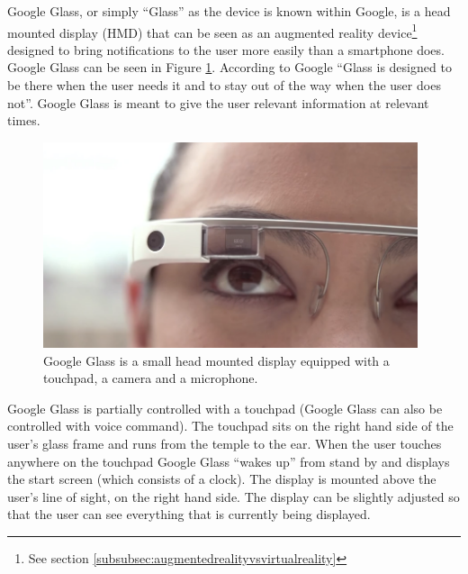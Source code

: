 Google Glass, or simply ``Glass'' as the device is known within Google, is a head mounted display (HMD) that can be seen as an augmented reality device\footnote{See section \ref{subsubsec:augmentedrealityvsvirtualreality}} designed to bring notifications to the user more easily than a smartphone does. Google Glass can be seen in Figure \ref{GoogleGlassHardware}. According to Google ``Glass is designed to be there when the user needs it and to stay out of the way when the user does not''.\cite{glassDesignPrinciples} Google Glass is meant to give the user relevant information at relevant times.\\ 

	\begin{figure}[ht!]
		\centering
		\includegraphics[width=110mm]{images/GoogleGlassHardware}
		\caption{Google Glass is a small head mounted display equipped with a touchpad, a camera and a microphone.\cite{ImagesGoogleGlassUI}}
		\label{GoogleGlassHardware}
	\end{figure}

Google Glass is partially controlled with a touchpad (Google Glass can also be controlled with voice command). The touchpad sits on the right hand side of the user's glass frame and runs from the temple to the ear. When the user touches anywhere on the touchpad Google Glass ``wakes up'' from stand by and displays the start screen (which consists of a clock). The display is mounted above the user's line of sight, on the right hand side. The display can be slightly adjusted so that the user can see everything that is currently being displayed. 

